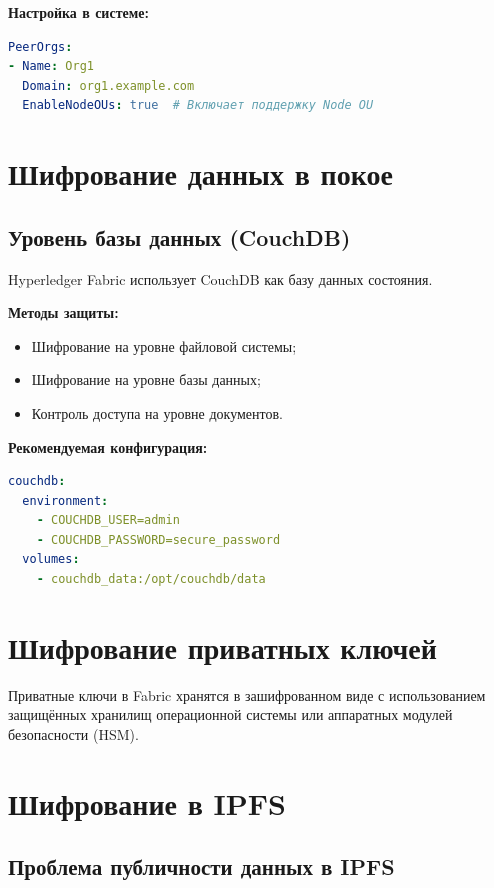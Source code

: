 \documentclass[a4paper,14pt]{extreport}
\begin{document}
\textbf{Настройка в системе:}
\begin{lstlisting}[language=YAML,caption=Конфигурация Node OU,captionpos=b]
PeerOrgs:
- Name: Org1
  Domain: org1.example.com
  EnableNodeOUs: true  # Включает поддержку Node OU
\end{lstlisting}

\section{Шифрование данных в покое}

\subsection{Уровень базы данных (CouchDB)}

Hyperledger Fabric использует CouchDB как базу данных состояния.

\textbf{Методы защиты:}
\begin{itemize}
    \item Шифрование на уровне файловой системы;
    \item Шифрование на уровне базы данных;
    \item Контроль доступа на уровне документов.
\end{itemize}

\textbf{Рекомендуемая конфигурация:}
\begin{lstlisting}[language=YAML,caption=Конфигурация CouchDB,captionpos=b]
couchdb:
  environment:
    - COUCHDB_USER=admin
    - COUCHDB_PASSWORD=secure_password
  volumes:
    - couchdb_data:/opt/couchdb/data
\end{lstlisting}

\section{Шифрование приватных ключей}

Приватные ключи в Fabric хранятся в зашифрованном виде с использованием защищённых хранилищ операционной системы или аппаратных модулей безопасности (HSM).

\section{Шифрование в IPFS}

\subsection{Проблема публичности данных в IPFS}
\end{document}
